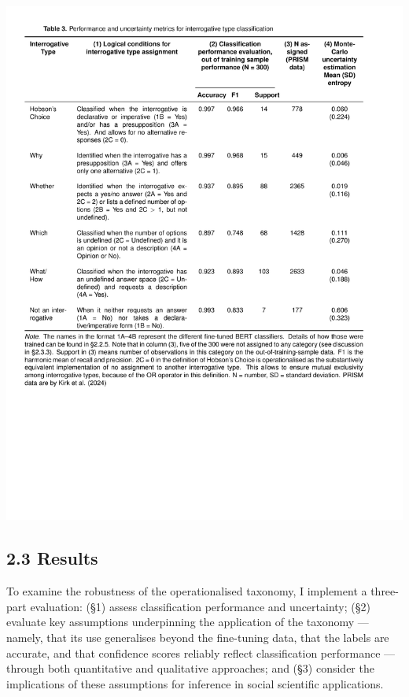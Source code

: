 \documentclass[
  12pt,
]{article}
\begin{document}
\begin{center}\includegraphics{../03_outputs/01_taxonomies_of_interrogatives/table_3} \end{center}

\clearpage

\subsection{2.3 Results}\label{results}

To examine the robustness of the operationalised taxonomy, I implement a three-part evaluation: (§1) assess classification performance and uncertainty; (§2) evaluate key assumptions underpinning the application of the taxonomy --- namely, that its use generalises beyond the fine-tuning data, that the labels are accurate, and that confidence scores reliably reflect classification performance --- through both quantitative and qualitative approaches; and (§3) consider the implications of these assumptions for inference in social scientific applications.
\end{document}

